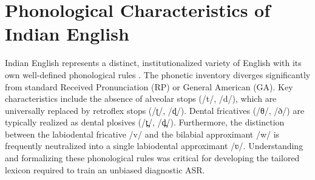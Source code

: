 \section{Phonological Characteristics of Indian English}
Indian English represents a distinct, institutionalized variety of English with its own well-defined phonological rules \cite{pandey2021indian}. The phonetic inventory diverges significantly from standard Received Pronunciation (RP) or General American (GA). Key characteristics include the absence of alveolar stops (/t/, /d/), which are universally replaced by retroflex stops (/ʈ/, /ɖ/). Dental fricatives (/θ/, /ð/) are typically realized as dental plosives (/t̪/, /d̪/). Furthermore, the distinction between the labiodental fricative /v/ and the bilabial approximant /w/ is frequently neutralized into a single labiodental approximant /ʋ/. Understanding and formalizing these phonological rules was critical for developing the tailored lexicon required to train an unbiased diagnostic ASR.
